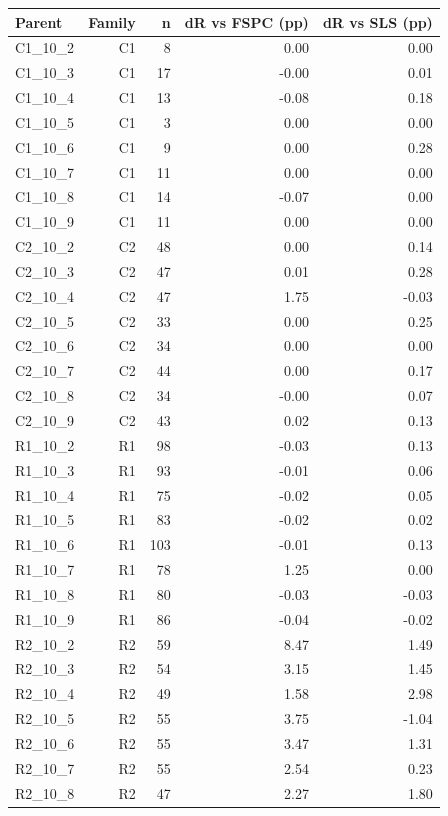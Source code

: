 \begingroup
\small
\setlength{\tabcolsep}{3pt}
\begin{longtable}{@{}lrrrr@{}}
\toprule
Parent & Family & n & dR vs FSPC (pp) & dR vs SLS (pp) \\
\midrule
\endhead
C1\_10\_2 & C1 & 8 & 0.00 & 0.00 \\
C1\_10\_3 & C1 & 17 & -0.00 & 0.01 \\
C1\_10\_4 & C1 & 13 & -0.08 & 0.18 \\
C1\_10\_5 & C1 & 3 & 0.00 & 0.00 \\
C1\_10\_6 & C1 & 9 & 0.00 & 0.28 \\
C1\_10\_7 & C1 & 11 & 0.00 & 0.00 \\
C1\_10\_8 & C1 & 14 & -0.07 & 0.00 \\
C1\_10\_9 & C1 & 11 & 0.00 & 0.00 \\
C2\_10\_2 & C2 & 48 & 0.00 & 0.14 \\
C2\_10\_3 & C2 & 47 & 0.01 & 0.28 \\
C2\_10\_4 & C2 & 47 & 1.75 & -0.03 \\
C2\_10\_5 & C2 & 33 & 0.00 & 0.25 \\
C2\_10\_6 & C2 & 34 & 0.00 & 0.00 \\
C2\_10\_7 & C2 & 44 & 0.00 & 0.17 \\
C2\_10\_8 & C2 & 34 & -0.00 & 0.07 \\
C2\_10\_9 & C2 & 43 & 0.02 & 0.13 \\
R1\_10\_2 & R1 & 98 & -0.03 & 0.13 \\
R1\_10\_3 & R1 & 93 & -0.01 & 0.06 \\
R1\_10\_4 & R1 & 75 & -0.02 & 0.05 \\
R1\_10\_5 & R1 & 83 & -0.02 & 0.02 \\
R1\_10\_6 & R1 & 103 & -0.01 & 0.13 \\
R1\_10\_7 & R1 & 78 & 1.25 & 0.00 \\
R1\_10\_8 & R1 & 80 & -0.03 & -0.03 \\
R1\_10\_9 & R1 & 86 & -0.04 & -0.02 \\
R2\_10\_2 & R2 & 59 & 8.47 & 1.49 \\
R2\_10\_3 & R2 & 54 & 3.15 & 1.45 \\
R2\_10\_4 & R2 & 49 & 1.58 & 2.98 \\
R2\_10\_5 & R2 & 55 & 3.75 & -1.04 \\
R2\_10\_6 & R2 & 55 & 3.47 & 1.31 \\
R2\_10\_7 & R2 & 55 & 2.54 & 0.23 \\
R2\_10\_8 & R2 & 47 & 2.27 & 1.80 \\

\end{longtable}
